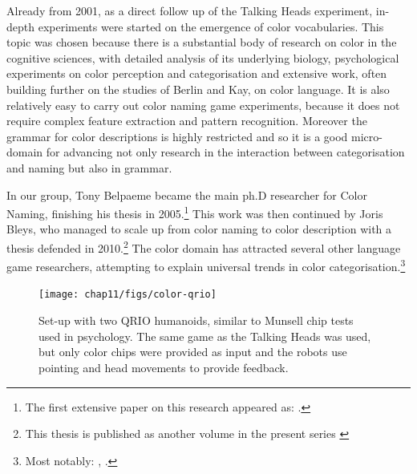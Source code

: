 Already from 2001, as a direct follow up of the Talking Heads experiment, in-depth experiments were started on the emergence of 
color vocabularies. This topic was chosen because 
there is a substantial body of research on color in the cognitive sciences, with 
detailed analysis of its underlying biology, psychological experiments on color perception and categorisation 
and extensive work, often building further on the studies of Berlin and Kay, on color language. It is also 
relatively easy to carry out color naming game experiments, because it does not require complex feature extraction 
and pattern recognition. Moreover the grammar for color descriptions is highly restricted and so it is a good micro-domain for 
advancing not only research in the interaction between categorisation and naming but also in grammar. 

In our group, Tony Belpaeme became the main ph.D researcher for Color Naming, finishing his thesis 
in 2005.\footnote{The first extensive paper on this research appeared as: \cite{Steels:2005}.}
This work was then continued by Joris Bleys, who managed to scale up from color naming to color description with 
a thesis defended in 2010.\footnote{This thesis is published as another volume in the present series \cite{Bleys:2014}}
The color domain has attracted several other language game researchers, attempting to explain 
universal trends in color categorisation.\footnote{Most notably: \cite{Puglisi:2008}, \cite{Baronchelli:2010}.}

\begin{figure}[htbp]
  \centerline{\texttt{[image: chap11/figs/color-qrio]}}
\caption{\label{fig:munsell} 
Set-up with two QRIO humanoids, similar to Munsell chip tests used in psychology. The same game as the Talking 
Heads was used, but only color chips were provided as input and the robots use pointing and head movements to 
provide feedback.}
\end{figure}

